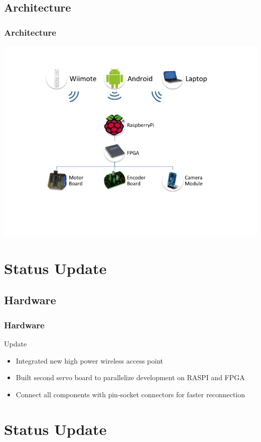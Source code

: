 \documentclass[pdf]{beamer}
\begin{document}
\subsection{Architecture}
\begin{frame}
\frametitle{Architecture}
  \begin{center}
  \includegraphics[width = \textwidth]{pics/architecture.png}
  \end{center}
\end{frame}

\section{Status Update}
\subsection{Hardware}
\begin{frame}
\frametitle{Hardware}
\begin{exampleblock}{Update}
\begin{itemize}
  \item Integrated new high power wireless access point
  \item Built second servo board to parallelize development on RASPI and FPGA
  \item Connect all components with pin-socket connectors for faster reconnection
\end{itemize}
\end{exampleblock}
\end{frame}

\section{Status Update}
\end{document}
